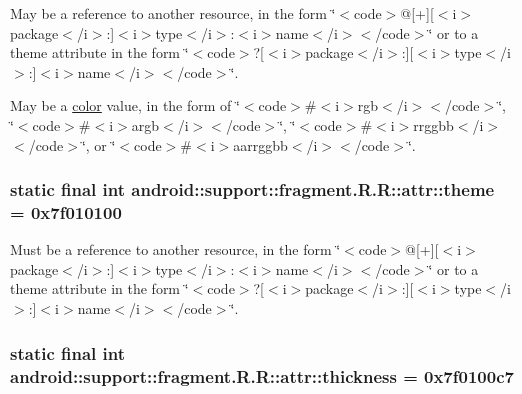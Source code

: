 May be a reference to another resource, in the form \char`\"{}$<$code$>$@\mbox{[}+\mbox{]}\mbox{[}$<$i$>$package$<$/i$>$:\mbox{]}$<$i$>$type$<$/i$>$:$<$i$>$name$<$/i$>$$<$/code$>$\char`\"{} or to a theme attribute in the form \char`\"{}$<$code$>$?\mbox{[}$<$i$>$package$<$/i$>$:\mbox{]}\mbox{[}$<$i$>$type$<$/i$>$:\mbox{]}$<$i$>$name$<$/i$>$$<$/code$>$\char`\"{}. 

May be a \hyperlink{classandroid_1_1support_1_1fragment_1_1_r_1_1color}{color} value, in the form of \char`\"{}$<$code$>$\#$<$i$>$rgb$<$/i$>$$<$/code$>$\char`\"{}, \char`\"{}$<$code$>$\#$<$i$>$argb$<$/i$>$$<$/code$>$\char`\"{}, \char`\"{}$<$code$>$\#$<$i$>$rrggbb$<$/i$>$$<$/code$>$\char`\"{}, or \char`\"{}$<$code$>$\#$<$i$>$aarrggbb$<$/i$>$$<$/code$>$\char`\"{}. \hypertarget{classandroid_1_1support_1_1fragment_1_1_r_1_1attr_c2b861150a6e68e7c98a5033df259cfb}{
\subsubsection[{theme}]{\setlength{\rightskip}{0pt plus 5cm}static final int android::support::fragment.R.R::attr::theme = 0x7f010100}}
\label{classandroid_1_1support_1_1fragment_1_1_r_1_1attr_c2b861150a6e68e7c98a5033df259cfb}


Must be a reference to another resource, in the form \char`\"{}$<$code$>$@\mbox{[}+\mbox{]}\mbox{[}$<$i$>$package$<$/i$>$:\mbox{]}$<$i$>$type$<$/i$>$:$<$i$>$name$<$/i$>$$<$/code$>$\char`\"{} or to a theme attribute in the form \char`\"{}$<$code$>$?\mbox{[}$<$i$>$package$<$/i$>$:\mbox{]}\mbox{[}$<$i$>$type$<$/i$>$:\mbox{]}$<$i$>$name$<$/i$>$$<$/code$>$\char`\"{}. \hypertarget{classandroid_1_1support_1_1fragment_1_1_r_1_1attr_83fff6be29b9da64eb7cf2dc55034973}{
\subsubsection[{thickness}]{\setlength{\rightskip}{0pt plus 5cm}static final int android::support::fragment.R.R::attr::thickness = 0x7f0100c7}}
\label{classandroid_1_1support_1_1fragment_1_1_r_1_1attr_83fff6be29b9da64eb7cf2dc55034973}


